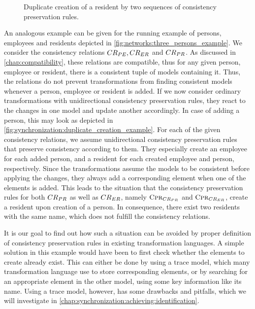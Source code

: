 \begin{figure}
    \centering
    
    \caption[Duplicate creation of an element]{Duplicate creation of a resident by two sequences of consistency preservation rules.}
    \label{fig:synchronization:duplicate_creation_example}
\end{figure}

An analogous example can be given for the running example of persons, employees and residents depicted in \autoref{fig:networks:three_persons_example}.
We consider the consistency relations $\consistencyrelation{CR}{PE}, \consistencyrelation{CR}{ER}$ and $\consistencyrelation{CR}{PR}$.
As discussed in \autoref{chap:compatibility}, these relations are compatible, thus for any given person, employee or resident, there is a consistent tuple of models containing it.
Thus, the relations do not prevent transformations from finding consistent models whenever a person, employee or resident is added.
If we now consider ordinary transformations with unidirectional consistency preservation rules, they react to the changes in one model and update another accordingly.
In case of adding a person, this may look as depicted in \autoref{fig:synchronization:duplicate_creation_example}.
For each of the given consistency relations, we assume unidirectional consistency preservation rules that preserve consistency according to them.
They especially create an employee for each added person, and a resident for each created employee and person, respectively.
Since the transformations assume the models to be consistent before applying the changes, they always add a corresponding element when one of the elements is added.
This leads to the situation that the consistency preservation rules for both $\consistencyrelation{CR}{PR}$ as well as $\consistencyrelation{CR}{ER}$, namely $\consistencypreservationrule{\consistencyrelation{CR}{PR}}$ and $\consistencypreservationrule{\consistencyrelation{CR}{ER}}$, create a resident upon creation of a person.
In consequence, there exist two residents with the same name, which does not fulfill the consistency relations.

It is our goal to find out how such a situation can be avoided by proper definition of consistency preservation rules in existing transformation languages.
A simple solution in this example would have been to first check whether the elements to create already exist.
This can either be done by using a trace model, which many transformation language use to store corresponding elements, or by searching for an appropriate element in the other model, using some key information like its name.
Using a trace model, however, has some drawbacks and pitfalls, which we will investigate in \autoref{chap:synchronization:achieving:identification}.

